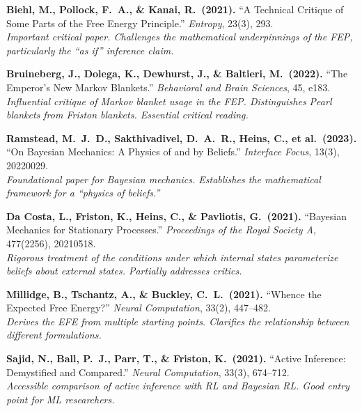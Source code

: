\documentclass[11pt,a4paper]{article}
\theoremstyle{definition}
\begin{document}
\begin{enumerate}[leftmargin=2em, label={[\arabic*]}]
  \item \textbf{Biehl, M., Pollock, F.\ A., \& Kanai, R.\ (2021).} ``A
    Technical Critique of Some Parts of the Free Energy Principle.''
    \textit{Entropy}, 23(3), 293.\\
    \textit{Important critical paper.  Challenges the mathematical
    underpinnings of the FEP, particularly the ``as if'' inference claim.}

  \item \textbf{Bruineberg, J., Dolega, K., Dewhurst, J., \& Baltieri, M.\
    (2022).} ``The Emperor's New Markov Blankets.'' \textit{Behavioral and
    Brain Sciences}, 45, e183.\\
    \textit{Influential critique of Markov blanket usage in the FEP.
    Distinguishes Pearl blankets from Friston blankets.  Essential critical
    reading.}

  \item \textbf{Ramstead, M.\ J.\ D., Sakthivadivel, D.\ A.\ R., Heins, C.,
    et al.\ (2023).} ``On Bayesian Mechanics: A Physics of and by Beliefs.''
    \textit{Interface Focus}, 13(3), 20220029.\\
    \textit{Foundational paper for Bayesian mechanics.  Establishes the
    mathematical framework for a ``physics of beliefs.''}

  \item \textbf{Da Costa, L., Friston, K., Heins, C., \& Pavliotis, G.\
    (2021).} ``Bayesian Mechanics for Stationary Processes.''
    \textit{Proceedings of the Royal Society A}, 477(2256), 20210518.\\
    \textit{Rigorous treatment of the conditions under which internal states
    parameterize beliefs about external states.  Partially addresses critics.}

  \item \textbf{Millidge, B., Tschantz, A., \& Buckley, C.\ L.\ (2021).}
    ``Whence the Expected Free Energy?'' \textit{Neural Computation}, 33(2),
    447--482.\\
    \textit{Derives the EFE from multiple starting points.  Clarifies the
    relationship between different formulations.}

  \item \textbf{Sajid, N., Ball, P.\ J., Parr, T., \& Friston, K.\ (2021).}
    ``Active Inference: Demystified and Compared.'' \textit{Neural Computation},
    33(3), 674--712.\\
    \textit{Accessible comparison of active inference with RL and Bayesian RL.
    Good entry point for ML researchers.}


\end{enumerate}
\end{document}

